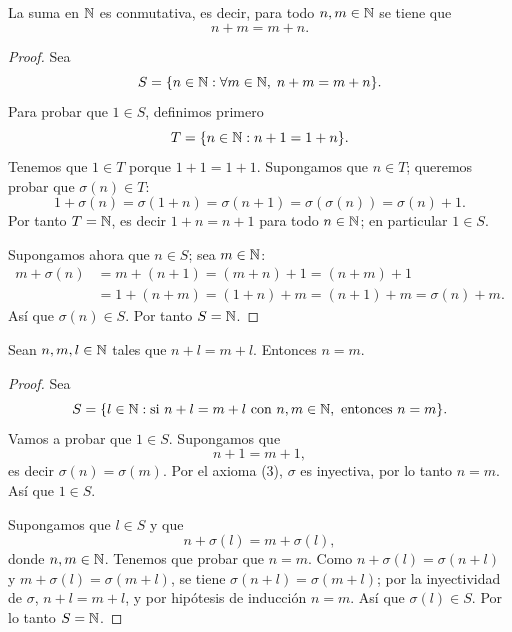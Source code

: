 \documentclass[12pt,a4paper]{book}
\begin{document}
    \begin{proposicion}
        La suma en $\mathbb{N}$ es conmutativa, es decir, para todo $n,m \in \mathbb{N}$ se tiene que
        \begin{equation*}
            n+m = m+n.
        \end{equation*}
    \end{proposicion}
    \begin{proof}
        Sea
        \begin{equation*}
            S = \{n \in \mathbb{N} : \forall m \in \mathbb{N}, \; n+m=m+n\}.
        \end{equation*}
        Para probar que $1 \in S$, definimos primero
        \begin{equation*}
            T = \{n \in \mathbb{N} : n+1 = 1+n\}.
        \end{equation*}
        Tenemos que $1 \in T$ porque $1+1=1+1$. Supongamos que $n \in T$; queremos probar que $\sigma(n) \in T$:
        \begin{equation*}
            1+\sigma(n) = \sigma(1+n) = \sigma(n+1) = \sigma(\sigma(n)) = \sigma(n)+1.
        \end{equation*}
        Por tanto $T = \mathbb{N}$, es decir $1+n=n+1$ para todo $n \in \mathbb{N}$; en particular $1 \in S$.

        Supongamos ahora que $n \in S$; sea $m \in \mathbb{N}$:
        \begin{align*}
            m+\sigma(n) &= m+(n+1) = (m+n)+1 = (n+m)+1 \\
            &= 1+(n+m) = (1+n)+m = (n+1)+m = \sigma(n)+m.
        \end{align*}
        Así que $\sigma(n) \in S$. Por tanto $S = \mathbb{N}$.
    \end{proof}

    \begin{proposicion}
        Sean $n,m,l \in \mathbb{N}$ tales que $n+l = m+l$. Entonces $n=m$.
    \end{proposicion}
    \begin{proof}
        Sea
        \begin{equation*}
            S = \{l \in \mathbb{N} : \text{si } n+l=m+l \text{ con } n,m \in \mathbb{N}, \text{ entonces } n=m\}.
        \end{equation*}
        Vamos a probar que $1 \in S$. Supongamos que
        \begin{equation*}
            n+1=m+1,
        \end{equation*}
        es decir $\sigma(n)=\sigma(m)$. Por el axioma (3), $\sigma$ es inyectiva, por lo tanto $n=m$. Así que $1 \in S$.

        Supongamos que $l \in S$ y que
        \begin{equation*}
            n+\sigma(l) = m+\sigma(l),
        \end{equation*}
        donde $n,m \in \mathbb{N}$. Tenemos que probar que $n=m$. Como $n+\sigma(l)=\sigma(n+l)$ y $m+\sigma(l)=\sigma(m+l)$, se tiene $\sigma(n+l)=\sigma(m+l)$; por la inyectividad de $\sigma$, $n+l=m+l$, y por hipótesis de inducción $n=m$. Así que $\sigma(l) \in S$. Por lo tanto $S=\mathbb{N}$.
    \end{proof}
\end{document}
